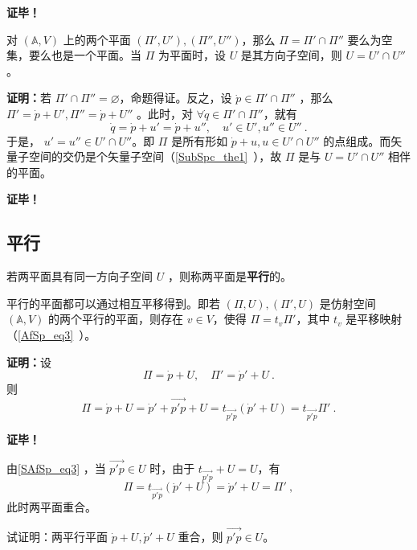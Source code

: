 \textbf{证毕！}
\begin{corollary}{}
对 $(\mathbb A,V)$ 上的两个平面 $(\Pi',U'),(\Pi'',U'')$，那么 $\Pi=\Pi'\cap\Pi''$ 要么为空集，要么也是一个平面。当 $\Pi$ 为平面时，设 $U$ 是其方向子空间，则 $U=U'\cap U''$。
\end{corollary}
\textbf{证明：}若 $\Pi'\cap\Pi''=\varnothing$，命题得证。反之，设 $\dot p\in \Pi'\cap\Pi''$ ，那么 $\Pi'=\dot p+U',\Pi''=\dot p+U''$ 。此时，对 $\forall\dot q\in\Pi'\cap\Pi''$，就有 \begin{equation}
\dot q=\dot p+u'=\dot p+u'',\quad u'\in U',u''\in U''~.
\end{equation}
于是， $u'=u''\in U'\cap U''$。即 $\Pi$ 是所有形如 $\dot p+u,u\in U'\cap U''$ 的点组成。而矢量子空间的交仍是个矢量子空间（\autoref{SubSpc_the1}~），故 $\Pi$ 是与 $U=U'\cap U''$ 相伴的平面。

\textbf{证毕！}
\subsection{平行}

\begin{definition}{}
若两平面具有同一方向子空间 $U$ ，则称两平面是\textbf{平行}的。
\end{definition}
\begin{theorem}{}
平行的平面都可以通过相互平移得到。即若 $(\Pi,U),(\Pi',U)$ 是仿射空间 $(\mathbb A,V)$ 的两个平行的平面，则存在 $v\in V$，使得 $\Pi=t_{v}\Pi'$，其中 $t_v$ 是平移映射（\autoref{AfSp_eq3}~）。
\end{theorem}
\textbf{证明：}设
\begin{equation}
\Pi=\dot p+U,\quad \Pi'=\dot p'+U~.
\end{equation}
则
\begin{equation}\label{SAfSp_eq3}
\Pi=\dot p+U=\dot p'+\overrightarrow{p'p}+U=t_{\overrightarrow{p'p}}(\dot p'+U)=t_{\overrightarrow{p'p}} \Pi'~.
\end{equation}

\textbf{证毕！}

由\autoref{SAfSp_eq3} ，当 $\overrightarrow{p'p}\in U$ 时，由于 $t_{\overrightarrow{p'p}}+U=U$，有
\begin{equation}
\Pi=t_{\overrightarrow{p'p}}(\dot p'+U)=\dot p'+U=\Pi'~,
\end{equation}
此时两平面重合。
\begin{exercise}{}
试证明：两平行平面 $\dot p+U,\dot p'+U$ 重合，则 $\overrightarrow{p'p}\in U$。
\end{exercise}
